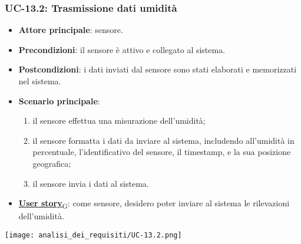 \subsubsection{UC-13.2: Trasmissione dati umidità}
\begin{itemize}
	\item \textbf{Attore principale}: sensore.
	\item \textbf{Precondizioni}: il sensore è attivo e collegato al sistema.
	\item \textbf{Postcondizioni}: i dati inviati dal sensore sono stati elaborati e memorizzati nel sistema.
	\item \textbf{Scenario principale}:
	      \begin{enumerate}
		      \item il sensore effettua una misurazione dell'umidità;
		      \item il sensore formatta i dati da inviare al sistema, includendo all'umidità in percentuale, l'identificativo del sensore,
		            il timestamp, e la sua posizione geografica;
		      \item il sensore invia i dati al sistema.
	      \end{enumerate}
	\item \href{https://7last.github.io/docs/rtb/documentazione-interna/glossario\#user-story}{\textbf{User story}\textsubscript{G}}: come sensore, desidero poter inviare al sistema le rilevazioni dell'umidità.
\end{itemize}

\begin{center}
	\texttt{[image: analisi\_dei\_requisiti/UC-13.2.png]}
\end{center}

